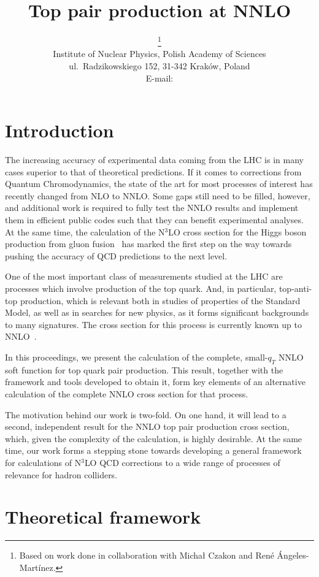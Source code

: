 \documentclass{PoS}
\title{Top pair production at NNLO}
\author{\speaker{Sebastian Sapeta}\thanks{
  Based on work done in collaboration with Micha\l{} Czakon and Ren\'e
  \'Angeles-Mart\'inez.
  }\\
  Institute of Nuclear Physics, Polish Academy of Sciences \\
  ul.\ Radzikowskiego 152, 31-342 Krak\'ow, Poland\\
  E-mail: \email{sebastian.sapeta@ifj.edu.pl}}
\begin{document}
\section{Introduction}

The increasing accuracy of experimental data coming from the LHC is in many
cases superior to that of theoretical predictions. 
%
If it comes to corrections from Quantum Chromodynamics, 
the state of the art for most processes of interest has 
recently changed from NLO to NNLO. Some gaps still need to be filled, however,
and additional work is required to fully test the NNLO results and implement
them in efficient public codes such that they can benefit experimental analyses.
%
At the same time, the calculation of the N$^3$LO cross section for the
Higgs boson production from gluon fusion~\cite{Anastasiou:2015ema} has marked
the first step on the way towards pushing the accuracy of QCD predictions to the
next level.

One of the most important class of measurements studied at the LHC are processes
which involve production of the top quark. And, in particular, top-anti-top
production, which is relevant both in studies of properties of the Standard
Model, as well as in searches for new physics, as it forms significant
backgrounds to many signatures. The cross section for this process is currently
known up to NNLO~\cite{Baernreuther:2012ws, Czakon:2012pz, Czakon:2012zr,
Czakon:2013goa, Czakon:2015owf, Czakon:2016ckf}.

In this proceedings, we present the calculation of the complete, small-$q_T$
NNLO soft function for top quark pair production. 
%
This result, together with the framework and tools developed to obtain it, form
key  elements of an alternative calculation of the complete NNLO cross section
for that process.

The motivation behind our work is two-fold. On one hand, it will lead to a
second, independent result for the NNLO top pair production cross section,
which, given the complexity of the calculation, is highly desirable.
At the same time, our work forms a stepping stone towards developing a general
framework for calculations of N$^3$LO QCD corrections to a wide range of
processes of relevance for hadron colliders.


\section{Theoretical framework}
\end{document}
